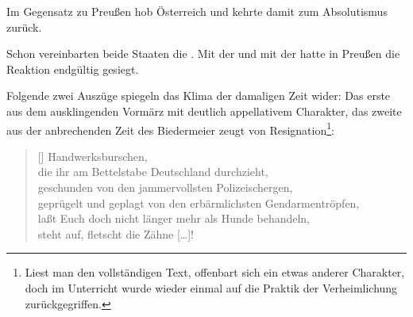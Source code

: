 Im Gegensatz zu Preußen hob Österreich  und kehrte damit zum Absolutismus zurück.

Schon  vereinbarten beide Staaten die . Mit der
 und mit der  hatte in Preußen die
Reaktion endgültig gesiegt.

Folgende zwei Auszüge spiegeln das Klima der damaligen Zeit wider: Das
erste aus dem ausklingenden Vormärz mit deutlich appellativem
Charakter, das zweite aus der anbrechenden Zeit des Biedermeier
 zeugt von Resignation\footnote{Liest man den
vollständigen Text, offenbart sich ein etwas anderer Charakter, doch
im Unterricht wurde wieder einmal auf die Praktik der Verheimlichung
zurückgegriffen.}:

\settowidth{\versewidth}{geprügelt und geplagt von den erbärmlichsten
Gendarmentröpfen,}

\begin{verse}[\versewidth]
Handwerksburschen, \\
die ihr am Bettelstabe Deutschland durchzieht, \\
geschunden von den jammervollsten Polizeischergen, \\
geprügelt und geplagt von den erbärmlichsten Gendarmentröpfen, \\
laßt Euch doch nicht länger mehr als Hunde behandeln, \\
steht auf, fletscht die Zähne \mbox{[\dots]}! 
\end{verse}

\settowidth{\versewidth}{Und wer nicht schläft in guter Ruh’,}

